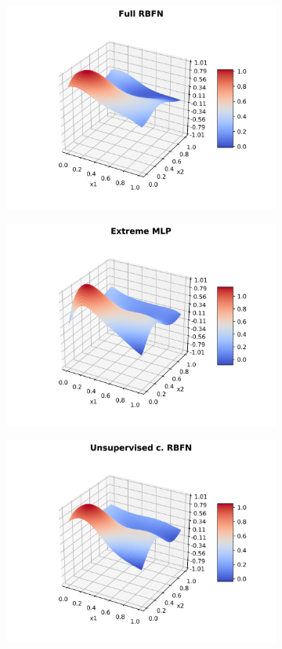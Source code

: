 \documentclass[a4paper]{article}
\numberwithin{equation}{section} %
\numberwithin{figure}{section} %
\numberwithin{table}{section} %
\theoremstyle{definition}
\begin{document}
\begin{figure}[H]
\begin{subfigure}{.32\textwidth}
		\includegraphics[width=1.0\linewidth]{images/RBFN_N_70_sigma_05_rho_1e-05.png}
	\end{subfigure}
	\begin{subfigure}{.32\textwidth}
		\centering
		\includegraphics[width=1.0\linewidth]{images/MLP_Extreme_Learning.png}
	\end{subfigure}
	\begin{subfigure}{.32\textwidth}
		\centering
		\includegraphics[width=1.0\linewidth]{images/RBFN_Extreme_Learning.png}

\end{subfigure}
\end{figure}
\end{document}
